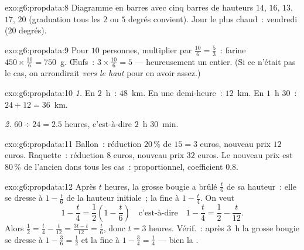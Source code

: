 \begin{solution}{exo:g6:propdata:8}
Diagramme en barres avec cinq barres de hauteurs $14$, $16$, $13$,
$17$, $20$ (graduation tous les $2$ ou $5$ degrés convient). Jour le
plus chaud~: vendredi ($20$ degrés).
\end{solution}

\begin{solution}{exo:g6:propdata:9}
Pour $10$ personnes, multiplier par $\frac{10}{6} = \frac53$~: farine
$450 \times \frac{10}{6} = 750$~g. Œufs~:
$3 \times \frac{10}{6} = 5$ --- heureusement un entier. (Si ce
n'était pas le cas, on arrondirait \emph{vers le haut} pour en avoir
assez.)
\end{solution}

\begin{solution}{exo:g6:propdata:10}
\emph{1.} En $2$~h~: $48$~km. En une demi-heure~: $12$~km. En
$1$~h $30$~: $24 + 12 = 36$~km.

\emph{2.} $60 \div 24 = 2.5$ heures, c'est-à-dire $2$~h $30$~min.
\end{solution}

\begin{solution}{exo:g6:propdata:11}
Ballon~: réduction $20\,\%$ de $15 = 3$ euros, nouveau prix $12$
euros. Raquette~: réduction $8$ euros, nouveau prix $32$ euros. Le
nouveau prix est $80\,\%$ de l'ancien dans tous les cas~:
proportionnel, coefficient $0.8$.
\end{solution}

\begin{solution}{exo:g6:propdata:12}
Après $t$ heures, la grosse bougie a brûlé $\frac t6$ de sa hauteur~:
elle se dresse à $1 - \frac t6$ de la hauteur initiale~; la fine à
$1 - \frac t4$. On veut
\[
1 - \frac t4 = \frac12 \left(1 - \frac t6\right)
\quad\text{c'est-à-dire}\quad
1 - \frac t4 = \frac12 - \frac t{12}.
\]
Alors $\frac12 = \frac t4 - \frac t{12} = \frac{3t - t}{12} =
\frac{t}{6}$, donc $t = 3$ heures. Vérif.~: après $3$~h la grosse
bougie se dresse à $1 - \frac36 = \frac12$ et la fine à
$1 - \frac34 = \frac14$ --- bien la .
\end{solution}

